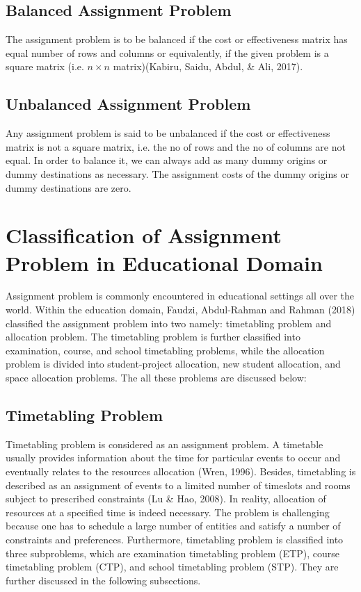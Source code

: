 \documentclass[11pt]{report}
\begin{document}
	\subsection{Balanced Assignment Problem}
	The assignment problem is to be balanced if the cost or effectiveness matrix has equal number of rows and columns or equivalently, if the given problem is a square matrix (i.e. $n\times n$ matrix)(Kabiru, Saidu, Abdul, \& Ali, 2017).
	
	\subsection{Unbalanced Assignment Problem}
	Any assignment problem is said to be unbalanced if the cost or effectiveness matrix is not a square matrix, i.e. the no of rows and the no of columns are not equal. In order to balance it, we can always add as many dummy origins or dummy destinations as necessary. The assignment costs of the dummy origins or dummy destinations are zero.
	
	\section{Classification of Assignment Problem in Educational Domain}
	Assignment problem is commonly encountered in educational settings all over the world. Within the education domain, Faudzi, Abdul-Rahman and Rahman (2018) classified the assignment problem into two namely: timetabling problem and allocation problem. The timetabling problem is further classified into examination, course, and school timetabling problems, while the allocation problem is divided into student-project allocation, new student allocation, and space allocation problems. The all these problems are discussed below:
	
	\subsection{Timetabling Problem}
	Timetabling problem is considered as an assignment problem. A timetable usually provides information about the time for particular events to occur and eventually relates to the resources allocation (Wren, 1996). Besides, timetabling is described as an assignment of events to a limited number of timeslots and rooms subject to prescribed constraints (Lu \& Hao, 2008). In reality, allocation of resources at a specified time is indeed necessary. The problem is challenging because one has to schedule a large number of entities and satisfy a number of constraints and preferences. Furthermore, timetabling problem is classified into three subproblems, which are examination timetabling problem (ETP), course timetabling problem (CTP), and school timetabling problem (STP). They are further discussed in the following subsections.
	
\end{document}
